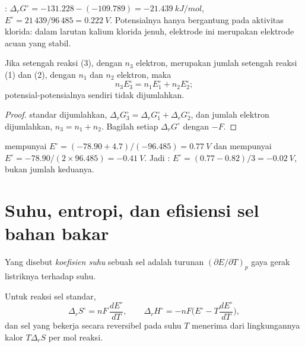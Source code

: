 \begin{example}\label{ex:b2:cell-thermodynamics:agcl}
: $\Delta_r G^\circ = -131.228 - (-109.789) =
\qty{-21.439}{kJ/mol}$, $E^\circ = 21\,439/96\,485 = \qty{0.222}{V}$.
Potensialnya hanya bergantung pada aktivitas klorida: dalam larutan
kalium klorida jenuh, elektrode ini merupakan elektrode acuan yang stabil.
\end{example}

\begin{proposition}\label{prop:b2:cell-thermodynamics:combining}
Jika setengah reaksi (3), dengan $n_3$ elektron, merupakan jumlah setengah
reaksi (1) dan (2), dengan $n_1$ dan $n_2$ elektron, maka
\[
  n_3E_3^\circ = n_1E_1^\circ + n_2E_2^\circ ;
\]
potensial-potensialnya sendiri tidak dijumlahkan.
\end{proposition}

\begin{proof}
 standar dijumlahkan, $\Delta_r G_3^\circ = \Delta_r G_1^\circ + \Delta_r
G_2^\circ$, dan jumlah elektron dijumlahkan, $n_3 = n_1 + n_2$.
Bagilah setiap $\Delta_r
G^\circ$ dengan $-F$.
\end{proof}

\begin{example}\label{ex:b2:cell-thermodynamics:iron}
 mempunyai $E^\circ = (-78.90 + 4.7)/(-96.485) = \qty{0.77}{V}$ dan  mempunyai
$E^\circ = -78.90/(2 \times 96.485) =
\qty{-0.41}{V}$. Jadi
: $E^\circ = (0.77 - 0.82)/3 =
\qty{-0.02}{V}$, bukan
jumlah keduanya.
\end{example}

\section{Suhu, entropi, dan efisiensi sel bahan bakar}

\begin{definition}\label{def:b2:cell-thermodynamics:temperature-coefficient}
Yang disebut \emph{koefisien suhu} sebuah sel adalah
turunan $(\partial E/\partial T)_p$ gaya gerak listriknya terhadap suhu.
\end{definition}

\begin{proposition}\label{prop:b2:cell-thermodynamics:entropy}
Untuk reaksi sel standar,
\[
  \Delta_r S^\circ = nF\,\frac{dE^\circ}{dT}, \qquad
  \Delta_r H^\circ = -nF\Big(E^\circ - T\frac{dE^\circ}{dT}\Big),
\]
dan sel yang bekerja secara reversibel pada suhu $T$ menerima dari
lingkungannya kalor $T\Delta_r S$ per mol reaksi.
\end{proposition}


